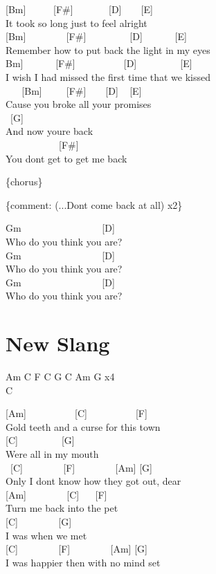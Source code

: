\documentclass[
  letterpaper,
]{scrbook}
\begin{document}
{[}Bm{]} ~ ~ ~ {[}F\#{]} ~ ~ ~ ~ {[}D{]} ~ ~ {[}E{]}\\
It took so long just to feel alright\\
{[}Bm{]} ~ ~ ~ ~ ~{[}F\#{]} ~ ~ ~ ~ ~ {[}D{]} ~ ~ ~ ~{[}E{]}\\
Remember how to put back the light in my eyes\\
\hspace*{0.333em}{[}Bm{]} ~ ~ ~ ~{[}F\#{]} ~ ~ ~ ~ ~ ~{[}D{]} ~ ~ ~ ~ ~
{[}E{]}\\
I wish I had missed the first time that we kissed\\
\hspace*{0.333em} ~ ~ {[}Bm{]} ~ ~ ~{[}F\#{]} ~ ~ {[}D{]} ~ {[}E{]}\\
\textquotesingle Cause you broke all your promises\\
\hspace*{0.333em} ~{[}G{]}\\
And now you\textquotesingle re back\\
\hspace*{0.333em} ~ ~ ~ ~ ~ ~ ~{[}F\#{]}\\
You don\textquotesingle t get to get me back

\{chorus\}

\{comment: (...Don\textquotesingle t come back at all) x2\}

Gm ~ ~ ~ ~ ~ ~ ~ ~ ~ ~{[}D{]}\\
Who do you think you are?\\
Gm ~ ~ ~ ~ ~ ~ ~ ~ ~ ~{[}D{]}\\
Who do you think you are?\\
Gm ~ ~ ~ ~ ~ ~ ~ ~ ~ ~{[}D{]}\\
Who do you think you are?

\hypertarget{new-slang}{%
\chapter{New Slang}\label{new-slang}}

Am C F C G C Am G x4\\
C

{[}Am{]} ~ ~ ~ ~ ~ ~{[}C{]} ~ ~ ~ ~ ~ ~{[}F{]}\\
Gold teeth and a curse for this town\\
{[}C{]} ~ ~ ~ ~ ~ {[}G{]}\\
Were all in my mouth\\
\hspace*{0.333em} ~{[}C{]} ~ ~ ~ ~ ~{[}F{]} ~ ~ ~ ~ ~{[}Am{]} {[}G{]}\\
Only I don\textquotesingle t know how they got out, dear\\
{[}Am{]} ~ ~ ~ ~ ~{[}C{]} ~ ~{[}F{]}\\
Turn me back into the pet\\
{[}C{]} ~ ~ ~ ~ ~{[}G{]}\\
I was when we met\\
{[}C{]} ~ ~ ~ ~ ~{[}F{]} ~ ~ ~ ~ ~{[}Am{]} {[}G{]}\\
I was happier then with no mind set
\end{document}

